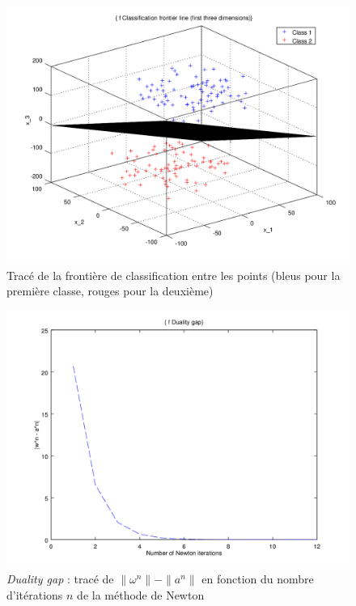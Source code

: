 \documentclass{article}
\begin{document}
         \begin{figure}
           \begin{center}
             \includegraphics[scale=0.5]{images/plane2.png}
             \caption{Tracé de la frontière de classification entre les points (bleus pour la première classe, rouges pour la deuxième)}
           \end{center}
         \end{figure}

         \begin{figure}
           \begin{center}
             \includegraphics[scale=0.5]{images/duality2.png}
             \caption{\emph{Duality gap} : tracé de $\|\omega^n\| - \|a^n\|$ en fonction du nombre d'itérations $n$ de la méthode de Newton}
           \end{center}
         \end{figure}
\end{document}
